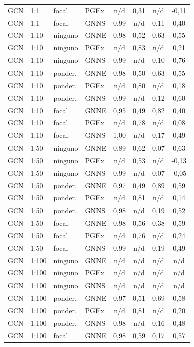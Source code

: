 \begin{longtable}{llll cccc}
GCN & 1:1 & focal & PGEx & n/d & 0,31 & n/d & -0,11 \\
GCN & 1:1 & focal & GNNS & 0,99 & n/d & 0,11 & 0,40 \\
GCN & 1:10 & ninguno & GNNE & 0,98 & 0,52 & 0,63 & 0,55 \\
GCN & 1:10 & ninguno & PGEx & n/d & 0,83 & n/d & 0,21 \\
GCN & 1:10 & ninguno & GNNS & 0,99 & n/d & 0,10 & 0,76 \\
GCN & 1:10 & ponder. & GNNE & 0,98 & 0,50 & 0,63 & 0,55 \\
GCN & 1:10 & ponder. & PGEx & n/d & 0,80 & n/d & 0,18 \\
GCN & 1:10 & ponder. & GNNS & 0,99 & n/d & 0,12 & 0,60 \\
GCN & 1:10 & focal & GNNE & 0,95 & 0,49 & 0,82 & 0,40 \\
GCN & 1:10 & focal & PGEx & n/d & 0,78 & n/d & 0,08 \\
GCN & 1:10 & focal & GNNS & 1,00 & n/d & 0,17 & 0,49 \\
GCN & 1:50 & ninguno & GNNE & 0,89 & 0,62 & 0,07 & 0,63 \\
GCN & 1:50 & ninguno & PGEx & n/d & 0,53 & n/d & -0,13 \\
GCN & 1:50 & ninguno & GNNS & 0,99 & n/d & 0,07 & -0,05 \\
GCN & 1:50 & ponder. & GNNE & 0,97 & 0,49 & 0,89 & 0,59 \\
GCN & 1:50 & ponder. & PGEx & n/d & 0,81 & n/d & 0,14 \\
GCN & 1:50 & ponder. & GNNS & 0,98 & n/d & 0,19 & 0,52 \\
GCN & 1:50 & focal & GNNE & 0,98 & 0,56 & 0,38 & 0,59 \\
GCN & 1:50 & focal & PGEx & n/d & 0,76 & n/d & 0,24 \\
GCN & 1:50 & focal & GNNS & 0,99 & n/d & 0,19 & 0,49 \\
GCN & 1:100 & ninguno & GNNE & n/d & n/d & n/d & n/d \\
GCN & 1:100 & ninguno & PGEx & n/d & n/d & n/d & n/d \\
GCN & 1:100 & ninguno & GNNS & n/d & n/d & n/d & n/d \\
GCN & 1:100 & ponder. & GNNE & 0,97 & 0,51 & 0,69 & 0,58 \\
GCN & 1:100 & ponder. & PGEx & n/d & 0,81 & n/d & 0,20 \\
GCN & 1:100 & ponder. & GNNS & 0,98 & n/d & 0,16 & 0,48 \\
GCN & 1:100 & focal & GNNE & 0,98 & 0,59 & 0,17 & 0,57 \\

\end{longtable}
